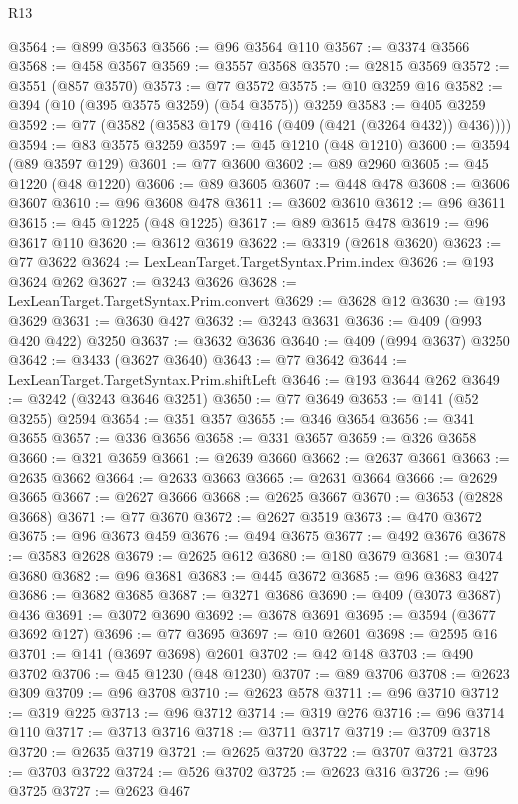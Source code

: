 \begin{lexlean}{R13}
\begin{coremodule}
{{{{{{{{{{{{{{{{{{{{{{{{{{{{{{{{{{{{{{{{{{{{{{{{{{{{{{{{{{{{{{{{{{{{{{{{{{{{{{{{{{{{{{{{{{{{{{{{{{{{{{{{{{@3564 := @899 @3563
@3566 := @96 @3564 @110
@3567 := @3374 @3566
@3568 := @458 @3567
@3569 := @3557 @3568
@3570 := @2815 @3569
@3572 := @3551 (@857 @3570)
@3573 := @77 @3572
@3575 := @10 @3259 @16
@3582 := @394 (@10 (@395 @3575 @3259) (@54 @3575)) @3259
@3583 := @405 @3259
@3592 := @77 (@3582 (@3583 @179 (@416 (@409 (@421 (@3264 @432)) @436))))
@3594 := @83 @3575 @3259
@3597 := @45 @1210 (@48 @1210)
@3600 := @3594 (@89 @3597 @129)
@3601 := @77 @3600
@3602 := @89 @2960
@3605 := @45 @1220 (@48 @1220)
@3606 := @89 @3605
@3607 := @448 @478
@3608 := @3606 @3607
@3610 := @96 @3608 @478
@3611 := @3602 @3610
@3612 := @96 @3611
@3615 := @45 @1225 (@48 @1225)
@3617 := @89 @3615 @478
@3619 := @96 @3617 @110
@3620 := @3612 @3619
@3622 := @3319 (@2618 @3620)
@3623 := @77 @3622
@3624 := LexLeanTarget.TargetSyntax.Prim.index
@3626 := @193 @3624 @262
@3627 := @3243 @3626
@3628 := LexLeanTarget.TargetSyntax.Prim.convert
@3629 := @3628 @12
@3630 := @193 @3629
@3631 := @3630 @427
@3632 := @3243 @3631
@3636 := @409 (@993 @420 @422) @3250
@3637 := @3632 @3636
@3640 := @409 (@994 @3637) @3250
@3642 := @3433 (@3627 @3640)
@3643 := @77 @3642
@3644 := LexLeanTarget.TargetSyntax.Prim.shiftLeft
@3646 := @193 @3644 @262
@3649 := @3242 (@3243 @3646 @3251)
@3650 := @77 @3649
@3653 := @141 (@52 @3255) @2594
@3654 := @351 @357
@3655 := @346 @3654
@3656 := @341 @3655
@3657 := @336 @3656
@3658 := @331 @3657
@3659 := @326 @3658
@3660 := @321 @3659
@3661 := @2639 @3660
@3662 := @2637 @3661
@3663 := @2635 @3662
@3664 := @2633 @3663
@3665 := @2631 @3664
@3666 := @2629 @3665
@3667 := @2627 @3666
@3668 := @2625 @3667
@3670 := @3653 (@2828 @3668)
@3671 := @77 @3670
@3672 := @2627 @3519
@3673 := @470 @3672
@3675 := @96 @3673 @459
@3676 := @494 @3675
@3677 := @492 @3676
@3678 := @3583 @2628
@3679 := @2625 @612
@3680 := @180 @3679
@3681 := @3074 @3680
@3682 := @96 @3681
@3683 := @445 @3672
@3685 := @96 @3683 @427
@3686 := @3682 @3685
@3687 := @3271 @3686
@3690 := @409 (@3073 @3687) @436
@3691 := @3072 @3690
@3692 := @3678 @3691
@3695 := @3594 (@3677 @3692 @127)
@3696 := @77 @3695
@3697 := @10 @2601
@3698 := @2595 @16
@3701 := @141 (@3697 @3698) @2601
@3702 := @42 @148
@3703 := @490 @3702
@3706 := @45 @1230 (@48 @1230)
@3707 := @89 @3706
@3708 := @2623 @309
@3709 := @96 @3708
@3710 := @2623 @578
@3711 := @96 @3710
@3712 := @319 @225
@3713 := @96 @3712
@3714 := @319 @276
@3716 := @96 @3714 @110
@3717 := @3713 @3716
@3718 := @3711 @3717
@3719 := @3709 @3718
@3720 := @2635 @3719
@3721 := @2625 @3720
@3722 := @3707 @3721
@3723 := @3703 @3722
@3724 := @526 @3702
@3725 := @2623 @316
@3726 := @96 @3725
@3727 := @2623 @467
}}}}}}}}}}}}}}}}}}}}}}}}}}}}}}}}}}}}}}}}}}}}}}}}}}}}}}}}}}}}}}}}}}}}}}}}}}}}}}}}}}}}}}}}}}}}}}}}}}}}}}}}}}
\end{coremodule}
\end{lexlean}

